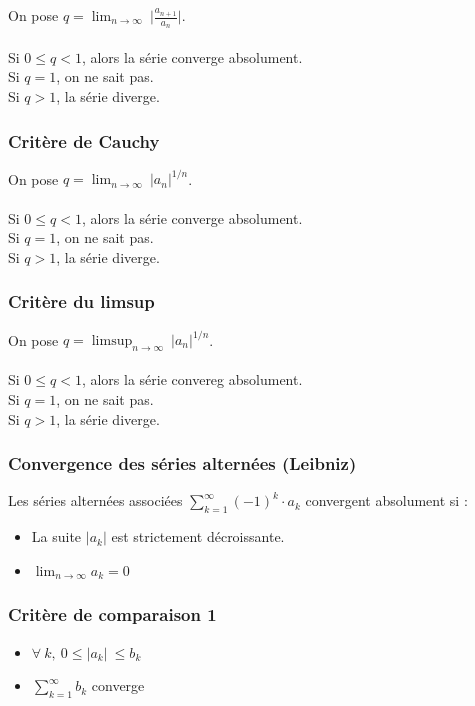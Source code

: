 \documentclass{article}
\begin{document}
On pose $ q = \lim_{n\to\infty}\ \lvert \frac{a_{n+1}}{a_n} \lvert $.\\\\
Si $ 0 \leq q < 1 $, alors la série converge absolument.\\
Si $ q = 1 $, on ne sait pas.\\
Si $ q > 1 $, la série diverge.

\subsubsection{Critère de Cauchy}

On pose $ q = \lim_{n\to\infty}\ {\lvert a_{n}\lvert}^{1/n} $.\\\\
Si $ 0 \leq q < 1 $, alors la série converge absolument.\\
Si $ q = 1 $, on ne sait pas.\\
Si $ q > 1 $, la série diverge.

\subsubsection{Critère du limsup}

On pose $ q = \limsup_{n\to\infty}\ {\lvert a_{n}\lvert}^{1/n} $.\\\\
Si $ 0 \leq q < 1 $, alors la série convereg absolument.\\
Si $ q = 1 $, on ne sait pas.\\
Si $ q > 1 $, la série diverge.

\subsubsection{Convergence des séries alternées (Leibniz)}

Les séries alternées associées $ \sum_{k=1}^{\infty} (-1)^k \cdot a_k $ convergent absolument si :
\begin{itemize}
    \item La suite $ |a_k| $ est strictement décroissante.
    \item $ \lim_{n\to\infty} a_k = 0 $
\end{itemize}

\subsubsection{Critère de comparaison 1}

\begin{itemize}
    \item $ \forall\ k,\ 0 \leq \lvert a_k \lvert\ \leq b_k $
    \item $ \sum_{k=1}^{\infty} b_k $ converge
\end{itemize}
\end{document}

